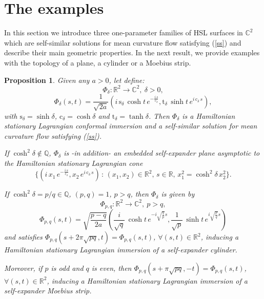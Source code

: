 \documentclass[leqno,11pt]{amsart}
\newtheorem{proposition}{Proposition}
\begin{document}
\section{The examples} 

In this section we introduce three one-parameter families of HSL
surfaces in ${\mathbb{C}}^2$ which are self-similar solutions for mean
curvature flow satisfying (\ref{ss}) and describe their main
geometric properties. In the next result, we provide examples with
the topology of a plane, a cylinder or a Moebius strip.

\begin{proposition}\label{ex1}
Given any $a > 0$, let define:
$$ \Phi_\delta:{\mathbb{R}}^2 \rightarrow {\mathbb{C}}^2, \ \delta >0,$$
\begin{equation}\label{Phib}
\Phi_\delta(s,t)= \frac{1}{\sqrt{2a}} \left( i \,\mathrm{s}_\delta
\,\cosh t\,e^{-\frac{i\,s}{\mathrm{c}_\delta}} , \mathrm{t}_\delta
\, \sinh t\, e^{i\, \mathrm{c}_\delta\,s} \right),
\end{equation}
with $\mathrm{s}_\delta=\sinh \delta $, $\mathrm{c}_\delta=\cosh
\delta$ and $\mathrm{t}_\delta=\tanh \delta$. Then $\Phi_\delta$
is a Hamiltonian stationary Lagrangian conformal immersion and a
self-similar solution for mean curvature flow satisfying
(\ref{ss}).

If $\cosh^2 \delta \notin {\mathbb{Q}}$, $\Phi_\delta$ is  -in addition- an
embedded self-expander plane asymptotic to the Hamiltonian
stationary Lagrangian cone
$$\{ (i\, x_1\, e^{-\frac{i\,s}{\mathrm{c}_\delta}},x_2\,  e^{i\,
\mathrm{c}_\delta\,s}) \, : \, (x_1,x_2)\in {\mathbb{R}}^2, \, s\in {\mathbb{R}} , \,
x_1^2=\cosh^2 \delta \, x_2^2 \}.$$

If $\cosh^2 \delta = p/q \in {\mathbb{Q}}$, $(p,q)=1$, $p>q$, then
$\Phi_\delta$ is given by 
$$\Phi_{p,q}:{\mathbb{R}}^2 \rightarrow {\mathbb{C}}^2, \ p>q,$$
\begin{equation}\label{Phipq}
\Phi_{p,q}(s,t)=\sqrt{\frac{p-q}{2a}} \left(
\frac{i}{\sqrt{q}}\,\cosh t\,e^{-i \sqrt{\frac{q}{p}}s} ,
\frac{1}{\sqrt{p}}\,\sinh t\,e^{i \sqrt{\frac{p}{q}}s} \right)
\end{equation}
and satisfies $\Phi_{p,q}(s+2\pi\sqrt{pq},t)=\Phi_{p,q}(s,t)$,
$\forall (s,t)\in {\mathbb{R}}^2$, inducing a Hamiltonian stationary
Lagrangian immersion of a self-expander cylinder.

Moreover, if $p$ is odd and $q$ is even, then
$\Phi_{p,q}(s+\pi\sqrt{pq},-t)=\Phi_{p,q}(s,t)$, $\forall (s,t)\in
{\mathbb{R}}^2$, inducing a Hamiltonian stationary Lagrangian immersion of a
self-expander Moebius strip.
\vspace{0.5cm}


\end{proposition}
\end{document}
